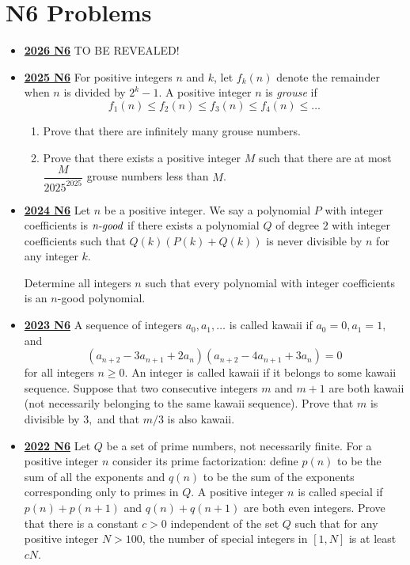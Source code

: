 \documentclass[11pt]{scrartcl}
\begin{document}
\section*{N6 Problems} \label{N6}
\begin{itemize}[leftmargin=*]

\item \href{https://www.imo-official.org/assets/documents/problems/2026/IMO2026SL.pdf}{\textbf{2026 N6}} TO BE REVEALED!


\item \href{https://artofproblemsolving.com/community/c6h3866880p38677010}{\textbf{2025 N6}} For positive integers $n$ and $k$, let $f_{k}(n)$ denote the remainder when $n$ is divided by $2^{k}-1.$ A positive integer $n$ is \textit{grouse} if
\[ f_{1}(n)\leqslant f_{2}(n)\leqslant f_{3}(n)\leqslant f_{4}(n)\leqslant \dots \]
\begin{enumerate}[leftmargin=*]
    \item[(a)]  Prove that there are infinitely many grouse numbers.
\item[(b)] Prove that there exists a positive integer $M$ such that there are at most $\dfrac{M}{2025^{2025}}$ grouse numbers less than $M$.
\end{enumerate}

\item \href{https://artofproblemsolving.com/community/c6h3610457p35340935}{\textbf{2024 N6}} Let $n$ be a positive integer. We say a polynomial $P$ with integer coefficients is $\emph{n-good}$ if there exists a polynomial $Q$ of degree $2$ with integer coefficients such that $Q(k)(P(k) + Q(k))$ is never divisible by $n$ for any integer $k$.

Determine all integers $n$ such that every polynomial with integer coefficients is an $n$-good polynomial.

\item \href{https://artofproblemsolving.com/community/c6h3359725p31218376}{\textbf{2023 N6}} A sequence of integers $a_0, a_1, \dots $ is called kawaii if $a_0 =0, a_1=1,$ and$$(a_{n+2}-3a_{n+1}+2a_n)(a_{n+2}-4a_{n+1}+3a_n)=0$$for all integers $n \geqslant  0$. An integer is called kawaii if it belongs to some kawaii sequence.
Suppose that two consecutive integers $m$ and $m+1$ are both kawaii (not necessarily belonging to the same kawaii sequence). Prove that $m$ is divisible by $3,$ and that $m/3$ is also kawaii.	

    \item \href{https://artofproblemsolving.com/community/c6h3107366p28104497}{\textbf{2022 N6}} Let $Q$ be a set of prime numbers, not necessarily finite. For a positive integer $n$ consider its prime factorization: define $p(n)$ to be the sum of all the exponents and $q(n)$ to be the sum of the exponents corresponding only to primes in $Q$. A positive integer $n$ is called special if $p(n)+p(n+1)$ and $q(n)+q(n+1)$ are both even integers. Prove that there is a constant $c>0$ independent of the set $Q$ such that for any positive integer $N>100$, the number of special integers in $[1,N]$ is at least $cN$.


\end{itemize}
\end{document}
